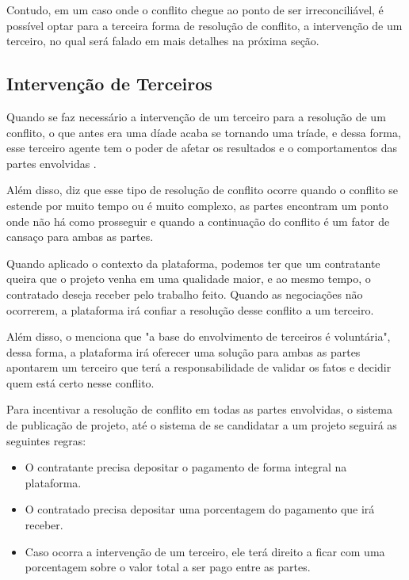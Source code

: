 Contudo, em um caso onde o conflito chegue ao ponto de ser irreconciliável, é possível optar para a terceira forma de resolução de conflito, a intervenção de um terceiro, no qual será falado em mais detalhes na próxima seção.

\subsection{Intervenção de Terceiros}

Quando se faz necessário a intervenção de um terceiro para a resolução de um conflito, o que antes era uma díade acaba se tornando uma tríade, e dessa forma, esse terceiro agente tem o poder de afetar os resultados e o comportamentos das partes envolvidas \cite{bercovitch2019social}.

Além disso, \citeauthor{bercovitch2019social} diz que esse tipo de resolução de conflito ocorre quando o conflito se estende por muito tempo ou é muito complexo, as partes encontram um ponto onde não há como prosseguir e quando a continuação do conflito é um fator de cansaço para ambas as partes.

Quando aplicado o contexto da plataforma, podemos ter que um contratante queira que o projeto venha em uma qualidade maior, e ao mesmo tempo, o contratado deseja receber pelo trabalho feito. Quando as negociações não ocorrerem, a plataforma irá confiar a resolução desse conflito a um terceiro.

Além disso, o \cite[p.13]{bercovitch2019social} menciona que "a base do envolvimento de terceiros é voluntária", dessa forma, a plataforma irá oferecer uma solução para ambas as partes apontarem um terceiro que terá a responsabilidade de validar os fatos e decidir quem está certo nesse conflito.

Para incentivar a resolução de conflito em todas as partes envolvidas, o sistema de publicação de projeto, até o sistema de se candidatar a um projeto seguirá as seguintes regras:

\begin{itemize}
\item O contratante precisa depositar o pagamento de forma integral na plataforma.
\item O contratado precisa depositar uma porcentagem do pagamento que irá receber.
\item Caso ocorra a intervenção de um terceiro, ele terá direito a ficar com uma porcentagem sobre o valor total a ser pago entre as partes.
\end{itemize}

